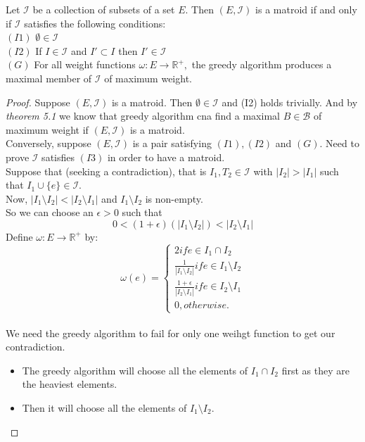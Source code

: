 \documentclass[../main.tex]{subfiles}
\begin{document}
\begin{thm}
Let $\mathcal{I}$ be a collection of subsets of a set $E.$ Then $(E,\mathcal{I})$ is a matroid if and only if $\mathcal{I}$ satisfies the following conditions:\\
$(I1)$ $\emptyset \in \mathcal{I}$\\
$(I2)$ If $I \in \mathcal{I}$ and $I' \subset I$ then $I' \in \mathcal{I}$\\
$(G)$ For all weight functions $\omega:E \longrightarrow \mathbb{R^+},$ the greedy algorithm produces a maximal member of $\mathcal{I}$ of maximum weight.
\end{thm}
\begin{proof}
Suppose $(E,\mathcal{I})$ is a matroid. Then $\emptyset \in \mathcal{I}$ and (I2) holds trivially.
And by \textit{theorem 5.1} we know that greedy algorithm cna find a maximal $B \in \mathcal{B}$ of maximum weight if $(E,\mathcal{I})$ is a matroid.\\
Conversely, suppose $(E,\mathcal{I})$ is a pair satisfying $(I1),(I2)$ and $(G).$ Need to prove $\mathcal{I}$ satisfies $(I3)$ in order to have a matroid.\\
Suppose that (seeking a contradiction), that is $I_1,T_2 \in \mathcal{I}$ with $|I_2|>|I_1|$ such that $I_1 \cup \{e\} \in \mathcal{I}.$\\
Now, $|I_1 \setminus I_2| < |I_2 \setminus I_1|$ and $I_1 \setminus I_2$ is non-empty.\\
So we can choose an $\epsilon>0$ such that
\begin{equation}
0 < (1+\epsilon)(|I_1 \setminus I_2|) < |I_2 \setminus I_1|
\end{equation}
Define $\omega:E \longrightarrow \mathbb{R^+}$ by:
\[
\omega(e) = \begin{cases}
               2 if e \in I_1 \cap I_2 \\
               \frac{1}{|I_1 \setminus I_2|} if e \in I_1 \setminus I_2\\
               \frac{1+\epsilon}{|I_2 \setminus I_1|} if e \in I_2 \setminus I_1 \\
               0, otherwise.
            \end{cases}
\]\\
We need the greedy algorithm to fail for only one weihgt function to get our contradiction.
\begin{itemize}
\item The greedy algorithm will choose all the elements of $I_1 \cap I_2$ first as they are the heaviest elements.
\item Then it will choose all the elements of $I_1 \setminus I_2.$

\end{itemize}
\end{proof}
\end{document}

